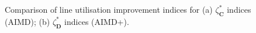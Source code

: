 \begin{figure}\centering
{}
\caption{Comparison of line utilisation improvement indices for (a) $\zeta_\textbf{C}^{*}$ indices (AIMD); (b) $\zeta_\textbf{D}^{*}$ indices (AIMD+).}
\label{ch4:fig:utilisation-aimd}
\end{figure}
